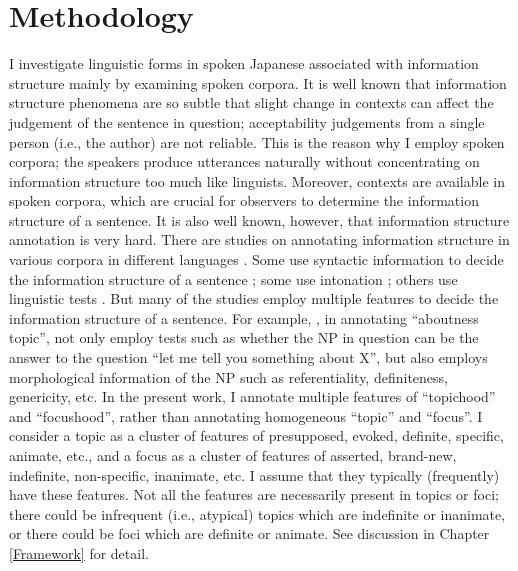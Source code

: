 \section{Methodology}\label{IntroMethodology}

I investigate linguistic forms in spoken Japanese associated with
information structure
mainly by examining spoken corpora.
It is well known that information structure phenomena are so subtle
that slight change in contexts can affect the judgement of the sentence in question;
acceptability judgements from a single person (i.e., the author) are not reliable.
This is the reason why I employ spoken corpora;
the speakers produce utterances naturally without concentrating on information structure too much like linguists.
Moreover, contexts are available in spoken corpora,
which are crucial for observers to determine the information structure of a sentence.
It is also well known, however,
that information structure annotation is very hard.
There are studies on annotating information structure in various corpora in different languages
\cite{hajicovaetal00,calhounetal05,gotzeetal07,ritzetal08,chiarcosetal11}.
Some use syntactic information to decide the information structure of a sentence \cite{hajicovaetal00};
some use intonation \cite{calhounetal05};
others use linguistic tests \cite{gotzeetal07,chiarcosetal11}.
But many of the studies employ multiple features to decide the information structure of a sentence.
For example,
,
in annotating ``aboutness topic'',
not only employ tests such as whether the NP in question can be the answer to the question ``let me tell you something about X'',
but also employs morphological information of the NP
such as referentiality, definiteness, genericity, etc.
In the present work, I annotate multiple features of ``topichood'' and ``focushood'',
rather than annotating homogeneous ``topic'' and ``focus''.
I consider a topic as a cluster of features of presupposed, evoked, definite, specific, animate, etc.,
and a focus as a cluster of features of asserted, brand-new, indefinite, non-specific, inanimate, etc.
I assume that they typically (frequently) have these features.
Not all the features are necessarily present in topics or foci;
there could be infrequent (i.e., atypical) topics which are indefinite or inanimate,
or there could be foci which are definite or animate.
See discussion in Chapter \ref{Framework} for detail.

